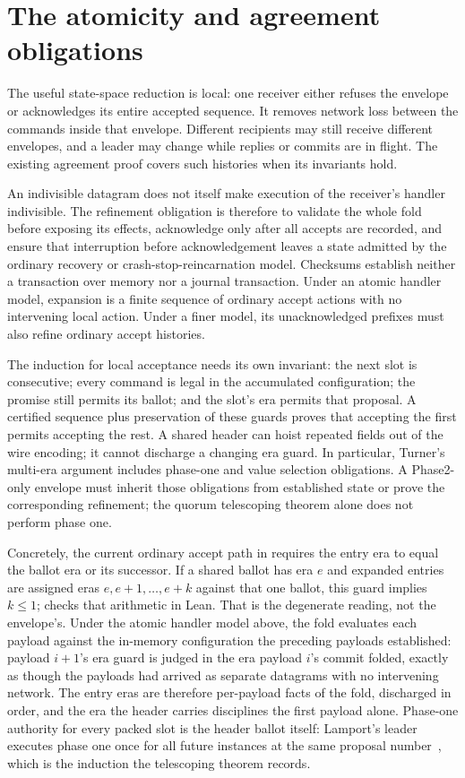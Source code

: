 \section{The atomicity and agreement obligations}\label{sec:fuse-refinement}
The useful state-space reduction is local: one receiver either refuses the
envelope or acknowledges its entire accepted sequence. It removes network
loss between the commands inside that envelope. Different recipients may
still receive different envelopes, and a leader may change while replies or
commits are in flight. The existing agreement proof covers such histories
when its invariants hold.

An indivisible datagram does not itself make execution of the receiver's
handler indivisible. The refinement obligation is therefore to validate the
whole fold before exposing its effects, acknowledge only after all accepts
are recorded, and ensure that interruption before acknowledgement leaves a
state admitted by the ordinary recovery or crash-stop-reincarnation model.
Checksums establish neither a transaction over memory nor a journal
transaction. Under an atomic handler model, expansion is a finite sequence of
ordinary accept actions with no intervening local action. Under a finer model,
its unacknowledged prefixes must also refine ordinary accept histories.

The induction for local acceptance needs its own invariant: the next slot is
consecutive; every command is legal in the accumulated configuration; the
promise still permits its ballot; and the slot's era permits that proposal.
A certified sequence plus preservation of these guards proves that accepting
the first permits accepting the rest. A shared header can hoist repeated
fields out of the wire encoding; it cannot discharge a changing era guard.
In particular, Turner's multi-era argument includes phase-one and value
selection obligations. A Phase2-only envelope must inherit those obligations
from established state or prove the corresponding refinement; the quorum
telescoping theorem alone does not perform phase one.

Concretely, the current ordinary accept path in
 requires the entry era to equal the ballot era
or its successor. If a shared ballot has era $e$ and expanded entries are
assigned eras $e,e+1,\ldots,e+k$ against that one ballot, this guard implies
$k\leq1$;  checks that arithmetic in Lean.
That is the degenerate reading, not the envelope's. Under the atomic handler
model above, the fold evaluates each payload against the in-memory
configuration the preceding payloads established: payload $i{+}1$'s era
guard is judged in the era payload $i$'s commit folded, exactly as though
the payloads had arrived as separate datagrams with no intervening network.
The entry eras are therefore per-payload facts of the fold, discharged in
order, and the era the header carries disciplines the first payload alone.
Phase-one authority for every packed slot is the header ballot itself:
Lamport's leader executes phase one once for all future instances at the
same proposal number~\cite{fuse-paxos}, which is the induction the
telescoping theorem records.

